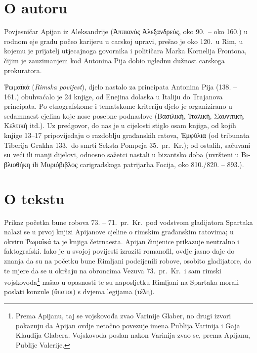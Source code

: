 \section*{O autoru}

Povjesničar Apijan iz Aleksandrije (Ἀππιανὸς Ἀλεξανδρεύς, oko 90.\ – oko 160.) u rodnom eje gradu počeo karijeru u carskoj upravi, prešao je oko 120.\ u Rim, u kojemu je prijatelj utjecajnoga govornika i političara Marka Kornelija Frontona, čijim je zauzimanjem kod Antonina Pija dobio uglednu dužnost carskoga prokuratora.

Ῥωμαϊκά (\textit{Rimska povijest}), djelo nastalo za principata Antonina Pija (138. – 161.) obuhvaćalo je 24 knjige, od Enejina dolaska u Italiju do Trajanova principata. Po etnografskome i tematskome kriteriju djelo je organizirano u sedamnaest cjelina koje nose posebne podnaslove (\textgreek{Βασιλική, Ἰταλική, Σαυνιτική, Κελτική} itd.). Uz predgovor, do nas je u cijelosti stiglo osam knjiga, od kojih knjige 13–17 pripovijedaju o razdoblju građanskih ratova, \textgreek{Ἐμφύλια} (od tribunata Tiberija Grakha 133.\ do smrti Seksta Pompeja 35.\ pr.~Kr.); od ostalih, sačuvani su veći ili manji dijelovi, odnosno sažetci nastali u bizantsko doba (uvršteni u \textgreek{Βιβλιοθήκη} ili \textgreek{Μυριόβιβλος} carigradskoga patrijarha Focija, oko 810./820. – 893.).

\section*{O tekstu}

Prikaz početka bune robova 73. – 71.\ pr.~Kr.\ pod vodstvom gladijatora Spartaka nalazi se u prvoj knjizi Apijanove cjeline o rimskim građanskim ratovima; u okviru \textgreek{Ῥωμαϊκά} ta je knjiga četrnaesta. Apijan činjenice prikazuje neutralno i faktografski. Iako je u svojoj povijesti izraziti romanofil, ovdje jasno daje do znanja da su na početku bune Rimljani podcijenili robove, osobito gladijatore, do te mjere da se u okršaju na obroncima Vezuva 73.\ pr.~Kr.\ i sam rimski vojskovođa\footnote{ Prema Apijanu, taj se vojskovođa zvao Varinije Glaber, no drugi izvori pokazuju da Apijan ovdje netočno povezuje imena Publija Varinija i Gaja Klaudija Glabera. Vojskovođa poslan nakon Varinija zvao se, prema Apijanu, Publije Valerije.} našao u opasnosti te su naposljetku Rimljani na Spartaka morali poslati konzule (ὕπατοι) s dvjema legijama (τέλη).


